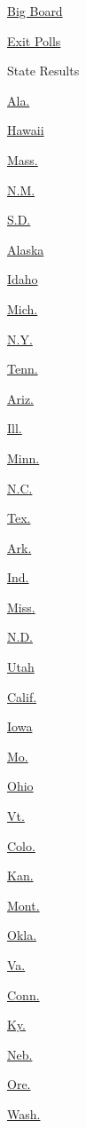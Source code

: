 \href{/elections/2010/results/governor/big-board.html}{Big Board}

\href{/elections/2010/results/governor/exit-polls.html}{Exit Polls}

State Results

\href{alabama.html}{Ala.}

\href{hawaii.html}{Hawaii}

\href{massachusetts.html}{Mass.}

\href{new-mexico.html}{N.M.}

\href{south-dakota.html}{S.D.}

\href{alaska.html}{Alaska}

\href{idaho.html}{Idaho}

\href{michigan.html}{Mich.}

\href{new-york.html}{N.Y.}

\href{tennessee.html}{Tenn.}

\href{arizona.html}{Ariz.}

\href{illinois.html}{Ill.}

\href{minnesota.html}{Minn.}

\href{north-carolina.html}{N.C.}

\href{texas.html}{Tex.}

\href{arkansas.html}{Ark.}

\href{indiana.html}{Ind.}

\href{mississippi.html}{Miss.}

\href{north-dakota.html}{N.D.}

\href{utah.html}{Utah}

\href{california.html}{Calif.}

\href{iowa.html}{Iowa}

\href{missouri.html}{Mo.}

\href{ohio.html}{Ohio}

\href{vermont.html}{Vt.}

\href{colorado.html}{Colo.}

\href{kansas.html}{Kan.}

\href{montana.html}{Mont.}

\href{oklahoma.html}{Okla.}

\href{virginia.html}{Va.}

\href{connecticut.html}{Conn.}

\href{kentucky.html}{Ky.}

\href{nebraska.html}{Neb.}

\href{oregon.html}{Ore.}

\href{washington.html}{Wash.}

